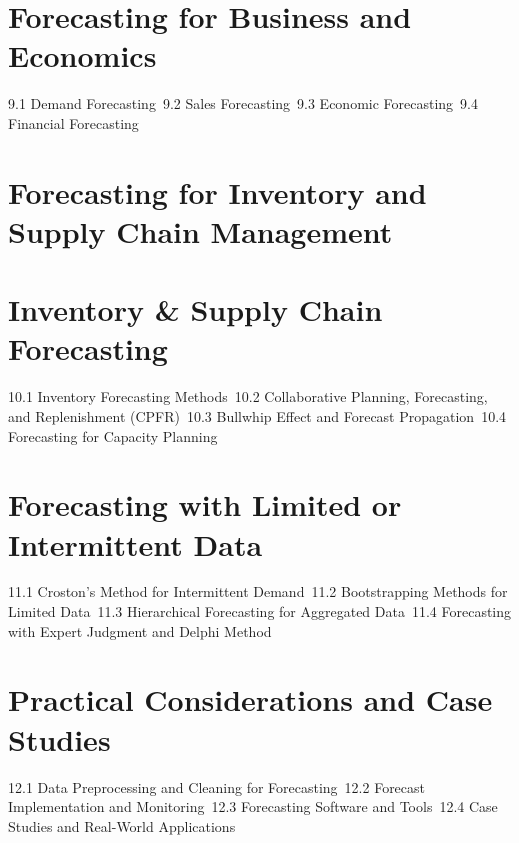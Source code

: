 \section{Forecasting for Business and Economics}
9.1 Demand Forecasting\
9.2 Sales Forecasting\
9.3 Economic Forecasting\
9.4 Financial Forecasting\
\section{Forecasting for Inventory and Supply Chain Management}
\section{Inventory \& Supply Chain Forecasting}
10.1 Inventory Forecasting Methods\
10.2 Collaborative Planning, Forecasting, and Replenishment (CPFR)\
10.3 Bullwhip Effect and Forecast Propagation\
10.4 Forecasting for Capacity Planning\
\section{Forecasting with Limited or Intermittent Data}
11.1 Croston's Method for Intermittent Demand\
11.2 Bootstrapping Methods for Limited Data\
11.3 Hierarchical Forecasting for Aggregated Data\
11.4 Forecasting with Expert Judgment and Delphi Method\
\section{Practical Considerations and Case Studies}
12.1 Data Preprocessing and Cleaning for Forecasting\
12.2 Forecast Implementation and Monitoring\
12.3 Forecasting Software and Tools\
12.4 Case Studies and Real-World Applications\
